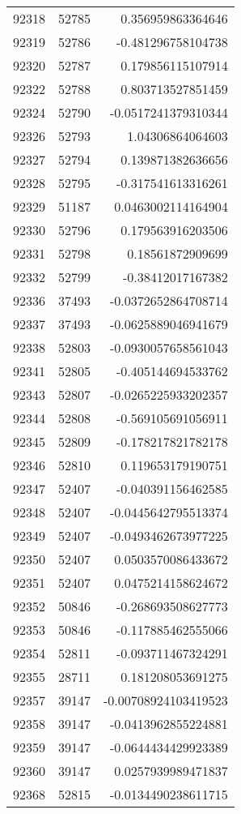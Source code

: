 \begin{tabular}{r | r | r}
92318 & 52785 & 0.356959863364646 \\
92319 & 52786 & -0.481296758104738 \\
92320 & 52787 & 0.179856115107914 \\
92322 & 52788 & 0.803713527851459 \\
92324 & 52790 & -0.0517241379310344 \\
92326 & 52793 & 1.04306864064603 \\
92327 & 52794 & 0.139871382636656 \\
92328 & 52795 & -0.317541613316261 \\
92329 & 51187 & 0.0463002114164904 \\
92330 & 52796 & 0.179563916203506 \\
92331 & 52798 & 0.18561872909699 \\
92332 & 52799 & -0.38412017167382 \\
92336 & 37493 & -0.0372652864708714 \\
92337 & 37493 & -0.0625889046941679 \\
92338 & 52803 & -0.0930057658561043 \\
92341 & 52805 & -0.405144694533762 \\
92343 & 52807 & -0.0265225933202357 \\
92344 & 52808 & -0.569105691056911 \\
92345 & 52809 & -0.178217821782178 \\
92346 & 52810 & 0.119653179190751 \\
92347 & 52407 & -0.040391156462585 \\
92348 & 52407 & -0.0445642795513374 \\
92349 & 52407 & -0.0493462673977225 \\
92350 & 52407 & 0.0503570086433672 \\
92351 & 52407 & 0.0475214158624672 \\
92352 & 50846 & -0.268693508627773 \\
92353 & 50846 & -0.117885462555066 \\
92354 & 52811 & -0.093711467324291 \\
92355 & 28711 & 0.181208053691275 \\
92357 & 39147 & -0.00708924103419523 \\
92358 & 39147 & -0.0413962855224881 \\
92359 & 39147 & -0.0644434429923389 \\
92360 & 39147 & 0.0257939989471837 \\
92368 & 52815 & -0.0134490238611715 \\

\end{tabular}
